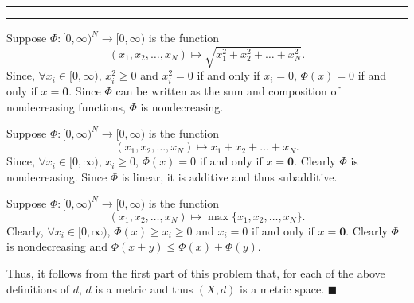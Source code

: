 \documentclass[11pt]{article}
\newcounter{questionCounter}
\newcounter{partCounter}[questionCounter]
\newenvironment{question}[2][\arabic{questionCounter}]{%
    \setcounter{partCounter}{0}%
    \vspace{.25in} \hrule \vspace{0.5em}%
        \noindent{\bf #2}%
    \vspace{0.8em} \hrule \vspace{.10in}%
    \addtocounter{questionCounter}{1}%
}{}
\renewcommand{\qed}{\quad $\blacksquare$}
\newcommand{\bzero}{\mathbf{0}}
\begin{document}
\begin{question}{Problem 4}
Suppose $\Phi: [0,\infty)^N \rightarrow [0,\infty)$ is the function
\[(x_1,x_2,\ldots,x_N) \mapsto \sqrt{x_1^2 + x_2^2 + \ldots + x_N^2}.\]
Since, $\forall x_i \in [0,\infty)$, $x_i^2 \geq 0$ and $x_i^2 = 0$ if and
only if $x_i = 0$, $\Phi(x) = 0$ if and only if $x = \bzero$. Since $\Phi$ can
be written as the sum and composition of nondecreasing functions, $\Phi$ is
nondecreasing.

Suppose $\Phi: [0,\infty)^N \rightarrow [0,\infty)$ is the function
\[(x_1,x_2,\ldots,x_N) \mapsto x_1 + x_2 + \ldots + x_N.\]
Since, $\forall x_i \in [0,\infty)$, $x_i \geq 0$, $\Phi(x) = 0$ if and only
if $x = \bzero$. Clearly $\Phi$ is nondecreasing. Since $\Phi$ is linear, it
is additive and thus subadditive.

Suppose $\Phi: [0,\infty)^N \rightarrow [0,\infty)$ is the function
\[(x_1,x_2,\ldots,x_N) \mapsto \max\{x_1,x_2,\ldots,x_N\}.\]
Clearly, $\forall x_i \in [0,\infty)$, $\Phi(x) \geq x_i \geq 0$ and $x_i = 0$
if and only if $x = \bzero$. Clearly $\Phi$ is nondecreasing and
$\Phi(x + y) \leq \Phi(x) + \Phi(y)$.

Thus, it follows from the first part of this problem that, for each of the
above definitions of $d$, $d$ is a metric and thus $(X,d)$ is a metric space.
\qed
\end{question}
\end{document}
